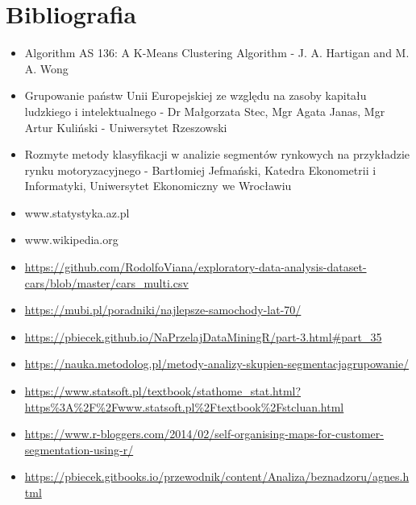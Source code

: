 \documentclass{article}
\begin{document}
\section{Bibliografia}
    \begin{itemize}
        \item Algorithm AS 136: A K-Means Clustering Algorithm - J. A. Hartigan and M. A. Wong
        \item Grupowanie państw Unii Europejskiej ze względu na zasoby kapitału ludzkiego i intelektualnego - Dr Małgorzata Stec, Mgr Agata Janas, Mgr Artur Kuliński - Uniwersytet Rzeszowski
        \item Rozmyte metody klasyfikacji w analizie segmentów rynkowych na przykładzie rynku motoryzacyjnego - Bartłomiej Jefmański, Katedra Ekonometrii i Informatyki, Uniwersytet Ekonomiczny we Wrocławiu
        \item www.statystyka.az.pl
        \item www.wikipedia.org
        \item \url{https://github.com/RodolfoViana/exploratory-data-analysis-dataset-cars/blob/master/cars_multi.csv}
        \item \url{https://mubi.pl/poradniki/najlepsze-samochody-lat-70/}
        \item \url{https://pbiecek.github.io/NaPrzelajDataMiningR/part-3.html#part_35}
        \item \url{https://nauka.metodolog.pl/metody-analizy-skupien-segmentacjagrupowanie/}
        \item \url{https://www.statsoft.pl/textbook/stathome_stat.html?https\%3A%2F%2Fwww.statsoft.pl%2Ftextbook%2Fstcluan.html}
        \item \url{https://www.r-bloggers.com/2014/02/self-organising-maps-for-customer-segmentation-using-r/}
        \item \url{https://pbiecek.gitbooks.io/przewodnik/content/Analiza/beznadzoru/agnes.html}
    \end{itemize}
\end{document}
